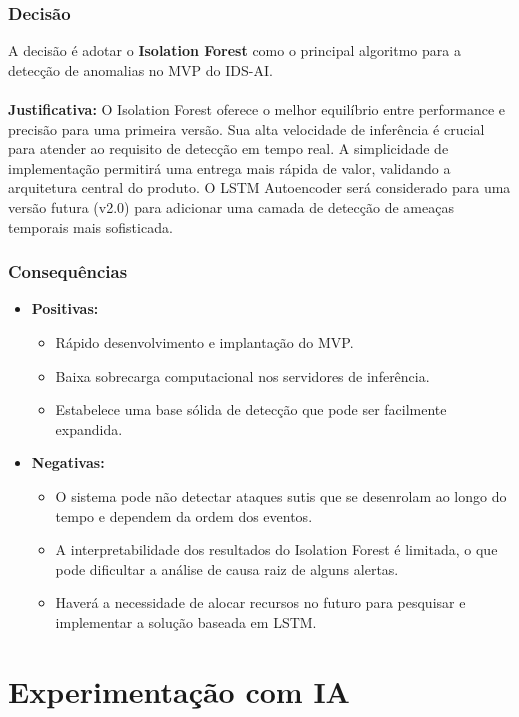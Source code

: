 \documentclass[a4paper,12pt]{article}
\begin{document}
\subsubsection{Decisão}
A decisão é adotar o \textbf{Isolation Forest} como o principal algoritmo para a detecção de anomalias no MVP do IDS-AI.
\\ \\
\textbf{Justificativa:} O Isolation Forest oferece o melhor equilíbrio entre performance e precisão para uma primeira versão. Sua alta velocidade de inferência é crucial para atender ao requisito de detecção em tempo real. A simplicidade de implementação permitirá uma entrega mais rápida de valor, validando a arquitetura central do produto. O LSTM Autoencoder será considerado para uma versão futura (v2.0) para adicionar uma camada de detecção de ameaças temporais mais sofisticada.

\subsubsection{Consequências}
\begin{itemize}
    \item \textbf{Positivas:}
    \begin{itemize}
        \item Rápido desenvolvimento e implantação do MVP.
        \item Baixa sobrecarga computacional nos servidores de inferência.
        \item Estabelece uma base sólida de detecção que pode ser facilmente expandida.
    \end{itemize}
    \item \textbf{Negativas:}
    \begin{itemize}
        \item O sistema pode não detectar ataques sutis que se desenrolam ao longo do tempo e dependem da ordem dos eventos.
        \item A interpretabilidade dos resultados do Isolation Forest é limitada, o que pode dificultar a análise de causa raiz de alguns alertas.
        \item Haverá a necessidade de alocar recursos no futuro para pesquisar e implementar a solução baseada em LSTM.
    \end{itemize}
\end{itemize}

\newpage

\section{Experimentação com IA}
\end{document}
